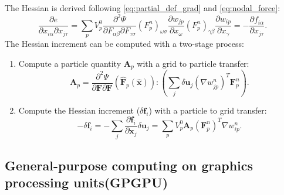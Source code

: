 \documentclass[m,times]{cgMA}
\begin{document}
The Hessian is derived following \ref{eq:partial_def_grad} and \ref{eq:nodal_force}:
\begin{equation}
  \frac{\partial e}{\partial {x}_{i\alpha} \partial x_{j\tau}}
= \sum_p V^0_p\frac { \partial ^ { 2 } \Psi } { \partial  { F}_{\alpha \beta} \partial { F } _{\tau \sigma}}  (F^n_p)_{\omega \sigma}\frac{\partial w_{jp}}{\partial x_\omega} (F^n_p)_{\gamma\beta}\frac{\partial w_{ip}}{\partial x_\gamma} = -\frac{\partial {f}_{i\alpha}}{\partial x_{j\tau}}.
\end{equation}
The Hessian increment can be computed with a two-stage process:
\begin{enumerate}
  \item Compute a particle quantity $\boldsymbol{A}_p$ with a grid to particle transfer:
    \begin{equation}\label{eq:Ap}
    \boldsymbol{A}_p = \frac { \partial ^ { 2 } \Psi } { \partial \boldsymbol { F } \partial \boldsymbol { F } } ( \hat { \boldsymbol { F } } _ { p } ( \hat { \boldsymbol { x } } )) : \left(\sum_j \delta \boldsymbol{u}_j (\nabla w_{jp}^n)^T \boldsymbol{F}^n_p\right).
    \end{equation}
  \item Compute the Hessian increment ($\delta \boldsymbol{f}_i$) with a particle to grid transfer:
    \begin{equation}\label{eq:delta_f}
  - \delta \boldsymbol{f}_i = - \sum_j \frac{\partial \boldsymbol{f}_i}{\partial \boldsymbol{x}_j} \delta \boldsymbol{u}_j = \sum_p V_p^0 \boldsymbol{A}_p(\boldsymbol{F}^n_p)^T \nabla w_{ip}^n.
\end{equation}
\end{enumerate}
\subsection{General-purpose computing on graphics processing units(GPGPU)}
\end{document}
